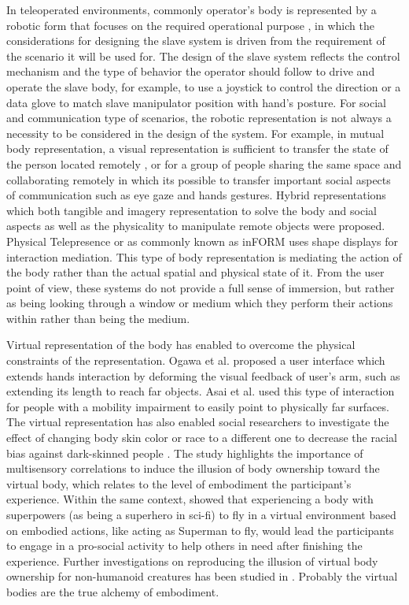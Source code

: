 In teleoperated environments, commonly operator's body is represented by a robotic form that focuses on the required operational purpose \cite{tsui2011exploring}, in which the considerations for designing the slave system is driven from the requirement of the scenario it will be used for. The design of the slave system reflects the control mechanism and the type of behavior the operator should follow to drive and operate the slave body, for example, to use a joystick to control the direction or a data glove to match slave manipulator position with hand's posture. For social and communication type of scenarios, the robotic representation is not always a necessity to be considered in the design of the system. For example, in mutual body representation, a visual representation is sufficient to transfer the state of the person located remotely \cite{ishii1992clearboard}, or for a group of people sharing the same space and collaborating remotely \cite{kunz2010collaboard} in which its possible to transfer important social aspects of communication such as eye gaze and hands gestures. Hybrid representations which both tangible and imagery representation to solve the body and social aspects as well as the physicality to manipulate remote objects were proposed. Physical Telepresence \cite{leithinger2014physical} or as commonly known as inFORM \cite{follmer2013inform} uses shape displays for interaction mediation. This type of body representation is mediating the action of the body rather than the actual spatial and physical state of it. From the user point of view, these systems do not provide a full sense of immersion, but rather as being looking through a window or medium which they perform their actions within rather than being the medium.

Virtual representation of the body has enabled to overcome the physical constraints of the representation. Ogawa et al. \cite{ogawa2012reachable,ogawa2016metamorphosis} proposed a user interface which extends hands interaction by deforming the visual feedback of user's arm, such as extending its length to reach far objects. Asai et al. \cite{asai2016extendedhand} used this type of interaction for people with a mobility impairment to easily point to physically far surfaces. The virtual representation has also enabled social researchers to investigate the effect of changing body skin color or race to a different one to decrease the racial bias against dark-skinned people \cite{peck2013putting,rosenberg2013virtual}. The study highlights the importance of multisensory correlations to induce the illusion of body ownership toward the virtual body, which relates to the level of embodiment the participant's experience. Within the same context, \cite{maister2015changing} showed that experiencing a body with superpowers (as being a superhero in sci-fi) to fly in a virtual environment based on embodied actions, like acting as Superman to fly, would lead the participants to engage in a pro-social activity to help others in need after finishing the experience. Further investigations on reproducing the illusion of virtual body ownership for non-humanoid creatures has been studied in \cite{lugrin2015anthropomorphism}. Probably the virtual bodies are the true alchemy of embodiment.


